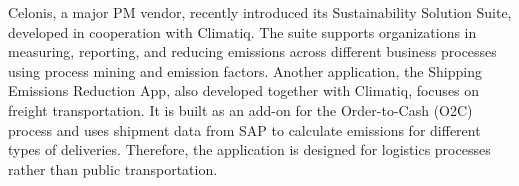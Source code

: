 Celonis, a major PM vendor, recently introduced its Sustainability Solution Suite\cite{celonis_sustainability_solution_suite_2025}, developed in cooperation with Climatiq. The suite supports organizations in measuring, reporting, and reducing emissions across different business processes using process mining and emission factors. Another application, the Shipping Emissions Reduction App\cite{celonis_shipping_emissions_2024}, also developed together with Climatiq, focuses on freight transportation. It is built as an add-on for the Order-to-Cash (O2C) process and uses shipment data from SAP to calculate emissions for different types of deliveries. Therefore, the application is designed for logistics processes rather than public transportation.







